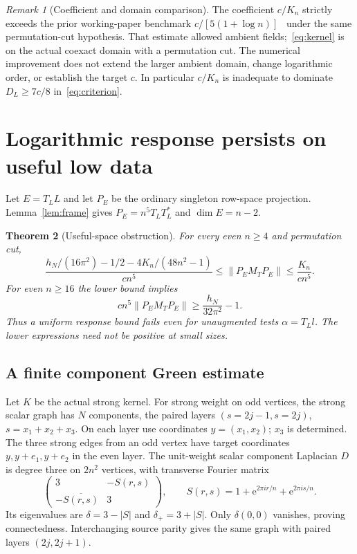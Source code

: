 \documentclass[11pt]{article}
\newcommand{\norm}[1]{\lVert#1\rVert}
\newcommand{\e}{\mathrm e}
\newtheorem{theorem}{Theorem}[section]
\theoremstyle{definition}
\theoremstyle{remark}
\newtheorem{remark}[theorem]{Remark}
\begin{document}
\begin{remark}[Coefficient and domain comparison]\label{rem:comparison}
The coefficient $c/K_n$ strictly exceeds the prior working-paper benchmark
$c/[5(1+\log n)]$~\cite{Eriksson274} under the same permutation-cut hypothesis. That estimate allowed
ambient fields;~\eqref{eq:kernel} is on
the actual coexact domain with a permutation cut. The numerical improvement
does not extend the larger ambient domain, change logarithmic order, or
establish the target $c$. In particular $c/K_n$ is inadequate to dominate
$D_L\ge7c/8$ in~\eqref{eq:criterion}.
\end{remark}

\section{Logarithmic response persists on useful low data}\label{sec:useful}
Let $E=T_LL$ and let $P_E$ be the ordinary singleton row-space projection.
Lemma~\ref{lem:frame} gives $P_E=n^5T_LT_L^*$ and $\dim E=n-2$.

\begin{theorem}[Useful-space obstruction]\label{thm:useful}
For every even $n\ge4$ and permutation cut,
\begin{equation}\label{eq:useful}
 \frac{h_N/(16\pi^2)-1/2-4K_n/(48n^2-1)}{cn^5}
 \le\norm{P_EM_TP_E}\le\frac{K_n}{cn^5}.
\end{equation}
For even $n\ge16$ the lower bound implies
\begin{equation}\label{eq:simpleuseful}
        cn^5\norm{P_EM_TP_E}\ge\frac{h_N}{32\pi^2}-1.
\end{equation}
Thus a uniform response bound fails even for unaugmented tests $\alpha=T_Ll$.
The lower expressions need not be positive at small sizes.
\end{theorem}

\subsection{A finite component Green estimate}
Let $K$ be the actual strong kernel. For strong weight on odd vertices,
the strong scalar graph has $N$ components, the paired layers
$(s=2j-1,s=2j)$, $s=x_1+x_2+x_3$. On each layer use coordinates
$y=(x_1,x_2)$; $x_3$ is determined. The three strong edges from an odd
vertex have target coordinates $y,y+e_1,y+e_2$ in the even layer. The
unit-weight scalar component Laplacian $D$ is degree three on $2n^2$
vertices, with transverse Fourier matrix
\[
 \begin{pmatrix}3&-S(r,s)\\-\overline{S(r,s)}&3\end{pmatrix},\qquad
 S(r,s)=1+\e^{2\pi ir/n}+\e^{2\pi is/n}.
\]
Its eigenvalues are $\delta=3-|S|$ and $\delta_+=3+|S|$. Only $\delta(0,0)$
vanishes, proving connectedness. Interchanging source parity gives the
same graph with paired layers $(2j,2j+1)$.
\end{document}

